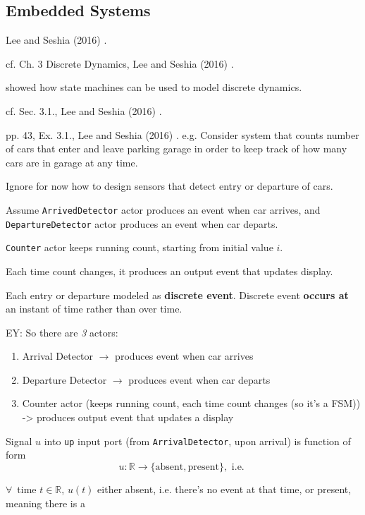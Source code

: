 \documentclass[10pt]{amsart}
\begin{document}
\begin{multicols*}{2}
\part{Embedded Systems}

Lee and Seshia (2016) \cite{LeSe2016}.

cf. Ch. 3 Discrete Dynamics, Lee and Seshia (2016) \cite{LeSe2016}. 

showed how state machines can be used to model discrete dynamics.

cf. Sec. 3.1., Lee and Seshia (2016) \cite{LeSe2016}. 

pp. 43, Ex. 3.1., Lee and Seshia (2016) \cite{LeSe2016}. e.g. Consider system that counts number of cars that enter and leave parking garage in order to keep track of how many cars are in garage at any time. 

Ignore for now how to design sensors that detect entry or departure of cars.

Assume \texttt{ArrivedDetector} actor produces an event when car arrives, and \texttt{DepartureDetector} actor produces an event when car departs.

\texttt{Counter} actor keeps running count, starting from initial value $i$. 

Each time count changes, it produces an output event that updates display.

Each entry or departure modeled as \textbf{discrete event}. Discrete event \textbf{occurs at} an instant of time rather than over time.

EY: So there are \emph{3} actors:

\begin{enumerate}
	\item Arrival Detector $\to$ produces event when car arrives
	\item Departure Detector $\to$ produces event when car departs
	\item Counter actor (keeps running count, each time count changes (so it's a FSM)) -> produces output event that updates a display
\end{enumerate}

Signal $u$ into \texttt{up} input port (from \texttt{ArrivalDetector}, upon arrival) is function of form
\[
u : \mathbb{R} \to \lbrace \text{absent}, \text{present} \rbrace, \text{ i.e. }
\]

$\forall \, $ time $t\in \mathbb{R}$, $u(t) $ either absent, i.e. there's no event at that time, or present, meaning there is a \\


\end{multicols*}
\end{document}
